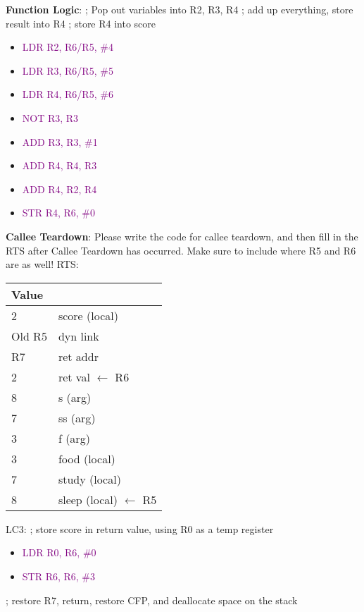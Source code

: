 \documentclass{article}
\begin{document}
\textbf{Function Logic}:
\newline
; Pop out variables into R2, R3, R4
\newline
; add up everything, store result into R4
\newline
; store R4 into score
\newline
 \begin{itemize}
    \item \textcolor{purple}{LDR R2, R6/R5, \#4}
    \item \textcolor{purple}{LDR R3, R6/R5, \#5}
    \item \textcolor{purple}{LDR R4, R6/R5, \#6}
    \item \textcolor{purple}{NOT R3, R3}
    \item \textcolor{purple}{ADD R3, R3, \#1}
    \item \textcolor{purple}{ADD R4, R4, R3}
    \item \textcolor{purple}{ADD R4, R2, R4} 
    \item \textcolor{purple}{STR R4, R6, \#0}
    
\end{itemize}

\newpage


\textbf{Callee Teardown}: Please write the code for callee teardown, and then fill in the RTS after Callee Teardown has occurred. Make sure to include where R5 and R6 are as well! \newline
RTS:
\begin{center}

\begin{tabular}{|p{3cm} p{5cm} |} 
\hline
 Value &   \\ [0.5ex] 
 \hline \hline
 2 & score (local)  \\
 \hline
 Old R5 & dyn link \\
 \hline
 R7 & ret addr \\
 \hline
 2 & ret val $\xleftarrow{}$ R6\\
 \hline
 8 & s (arg) \\ 
 \hline
 7 & ss (arg)\\
 \hline
 3 & f (arg) \\
 \hline
 3 & food (local) \\
 \hline
 7 & study (local)\\ [1ex]
 \hline
  8 & sleep (local) $\xleftarrow{}$ R5\\ [1ex]
  \hline
 
\end{tabular}
\end{center}
LC3:
\newline
; store score in return value, using R0 as a temp register
\begin{itemize}
    \item \textcolor{purple}{LDR R0, R6, \#0}
    \item \textcolor{purple}{STR R6, R6, \#3}
\end{itemize}
\newline
; restore R7, return, restore CFP, and deallocate space on the stack
\end{document}
